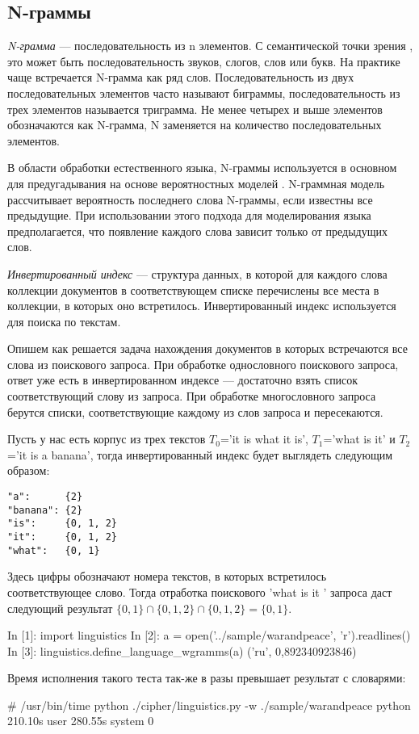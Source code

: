 \subsection{N-граммы}
\DEF\textit{N-грамма} — последовательность из n элементов. С семантической точки зрения
, это может быть последовательность звуков, слогов, слов или букв. На практике 
чаще встречается N-грамма как ряд слов. Последовательность из двух последовательных 
элементов часто называют биграммы, последовательность из трех элементов 
называется триграмма. Не менее четырех и выше элементов обозначаются как 
N-грамма, N заменяется на количество последовательных элементов.

В области обработки естественного языка, N-граммы используется 
в основном для предугадывания на основе вероятностных моделей
. N-граммная модель рассчитывает вероятность последнего слова 
N-граммы, если известны все предыдущие. При использовании этого 
подхода для моделирования языка предполагается, что появление 
каждого слова зависит только от предыдущих слов.

\DEF\textit{Инвертированный индекс} — структура данных, в которой 
для каждого слова коллекции документов в соответствующем списке 
перечислены все места в коллекции, в которых оно встретилось. 
Инвертированный индекс используется для поиска по текстам.

Опишем как решается задача нахождения документов в которых встречаются 
все слова из поискового запроса. При обработке однословного поискового 
запроса, ответ уже есть в инвертированном индексе — достаточно 
взять список соответствующий слову из запроса. При обработке 
многословного запроса берутся списки, соответствующие каждому 
из слов запроса и пересекаются.

Пусть у нас есть корпус из трех текстов $T_0$='it is what it is', 
$T_1$='what is it' и $T_2$='it is a banana', тогда инвертированный 
индекс будет выглядеть следующим образом:

\begin{verbatim}
"a":      {2}
"banana": {2}
"is":     {0, 1, 2}
"it":     {0, 1, 2}
"what":   {0, 1}
\end{verbatim}

Здесь цифры обозначают номера текстов, в которых встретилось 
соответствующее слово. Тогда отработка поискового 'what is it
' запроса даст следующий результат $\{0,1\} \cap \{0,1,2\} \cap 
\{0,1,2\} = \{0,1\}$.

\begin{listing}[1]{1}
In [1]: import linguistics
In [2]: a = open('../sample/warandpeace', 'r').readlines()
In [3]: linguistics.define\_language\_wgramms(a)
('ru', 0,892340923846)
\end{listing}

Время исполнения такого теста так-же в разы превышает результат 
с словарями:

\begin{listing}[1]{1}
# /usr/bin/time python ./cipher/linguistics.py -w ./sample/warandpeace 
python  210.10s user 280.55s system 0%
\end{listing}
